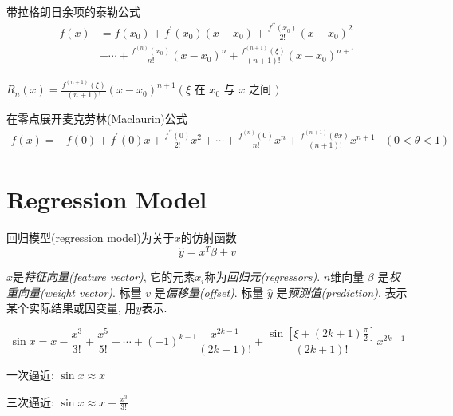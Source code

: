 \begin{corollary}[对于高阶余项的公式]
    带拉格朗日余项的泰勒公式
    $$ \begin{aligned} f(x) &=f\left(x_{0}\right)+f^{\prime}\left(x_{0}\right)\left(x-x_{0}\right)+\frac{f^{\prime \prime}\left(x_{0}\right)}{2 !}\left(x-x_{0}\right)^{2} \\ &+\cdots+\frac{f^{(n)}\left(x_{0}\right)}{n !}\left(x-x_{0}\right)^{n}+\frac{f^{(n+1)}(\xi)}{(n+1) !}\left(x-x_{0}\right)^{n+1} \end{aligned} $$

    $ R_{n}(x)=\frac{f^{(n+1)}(\xi)}{(n+1) !}\left(x-x_{0}\right)^{n+1}\left(\xi\right. $ 在 $ x_{0} $ 与 $ x  $ 之间 $ ) $
\end{corollary}

\begin{corollary}在零点展开麦克劳林(Maclaurin)公式
    $$ \begin{aligned} f(x)=& f(0)+f^{\prime}(0) x+\frac{f^{\prime \prime}(0)}{2 !} x^{2}+\cdots+\frac{f^{(n)}(0)}{n !} x^{n} +\frac{f^{(n+1)}(\theta x)}{(n+1) !} x^{n+1} &(0<\theta<1) \end{aligned} $$
    
\end{corollary}


\section{Regression Model}
\begin{definition}
    回归模型(regression model)为关于$x$的仿射函数
    $$ \hat{y}=x^{T} \beta+v $$

    $x$是\textit{特征向量(feature vector)}, 它的元素$x_i$称为\textit{回归元(regressors)}. $n$维向量 $ \beta $ 是\textit{权重向量(weight vector)}. 标量 $ v $ 是\textit{偏移量(offset)}. 标量 $ \hat{y} $ 是\textit{预测值(prediction)}. 表示某个实际结果或因变量, 用$y$表示. 
\end{definition}

\begin{example}
    $$ \sin x= x-\frac{x^{3}}{3 !}+\frac{x^{5}}{5 !}-\cdots+(-1)^{k-1} \frac{x^{2 k-1}}{(2 k-1) !}+\frac{\sin \left[\xi+(2 k+1) \frac{\pi}{2}\right]}{(2 k+1) !} x^{2 k+1} $$

    一次逼近: $  \sin x \approx x $

    三次逼近: $  \sin x \approx x-\frac{x^{3}}{3 !} $
\end{example}

